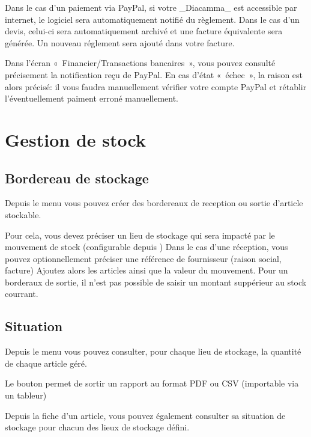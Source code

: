 \documentclass[a4paper,10pt,oneside,french]{sphinxmanual}
\begin{document}
Dans le cas d’un paiement via PayPal, si votre \_Diacamma\_ est accessible par internet, le logiciel sera automatiquement notifié du règlement.
Dans le cas d’un devis, celui-ci sera automatiquement archivé et une facture équivalente sera générée.
Un nouveau réglement sera ajouté dans votre facture.

Dans l’écran « Financier/Transactions bancaires », vous pouvez consulté précisement la notification reçu de PayPal.
En cas d’état « échec », la raison est alors précisé: il vous faudra manuellement vérifier votre compte PayPal et rétablir l’éventuellement paiment erroné manuellement.


\section{Gestion de stock}
\label{\detokenize{invoice/stock::doc}}\label{\detokenize{invoice/stock:gestion-de-stock}}

\subsection{Bordereau de stockage}
\label{\detokenize{invoice/stock:bordereau-de-stockage}}
Depuis le menu  vous pouvez créer des bordereaux de reception ou sortie d’article stockable.

Pour cela, vous devez préciser un lieu de stockage qui sera impacté par le mouvement de stock (configurable depuis )
Dans le cas d’une réception, vous pouvez optionnellement préciser une référence de fournisseur (raison social, facture)
Ajoutez alors les articles ainsi que la valeur du mouvement.
Pour un borderaux de sortie, il n’est pas possible de saisir un montant suppérieur au stock courrant.


\subsection{Situation}
\label{\detokenize{invoice/stock:situation}}
Depuis le menu  vous pouvez consulter, pour chaque lieu de stockage, la quantité de chaque article géré.

Le bouton  permet de sortir un rapport au format PDF ou CSV (importable via un tableur)

Depuis la fiche d’un article, vous pouvez également consulter sa situation de stockage pour chacun des lieux de stockage défini.
\end{document}
